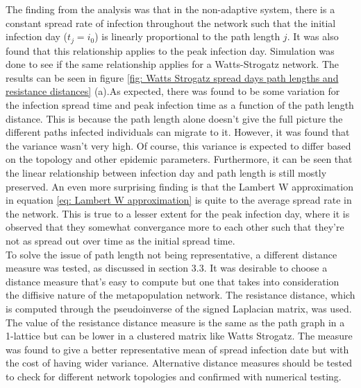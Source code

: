 The finding from the analysis was that in the non-adaptive system, there is a constant spread rate of infection throughout the network such that the initial infection day ($t_j=i_0$) is linearly proportional to the path length $j$. It was also found that this relationship applies to the peak infection day. Simulation was done to see if the same relationship applies for a Watts-Strogatz network. The results can be seen in figure \ref{fig: Watts Strogatz spread days path lengths and resistance distances} (a).As expected, there was found to be some variation for the infection spread time and peak infection time as a function of the path length distance. This is because the path length alone doesn't give the full picture the different paths infected individuals can migrate to it. However, it was found that the variance wasn't very high. Of course, this variance is expected to differ based on the topology and other epidemic parameters. Furthermore, it can be seen that the linear relationship between infection day and path length is still mostly preserved. An even more surprising finding is that the Lambert W approximation in equation \ref{eq: Lambert W approximation} is quite to the average spread rate in the network. This is true to a lesser extent for the peak infection day, where it is observed that they somewhat convergance more to each other such that they're not as spread out over time as the initial spread time.\\

To solve the issue of path length not being representative, a different distance measure was tested, as discussed in section 3.3. It was desirable to choose a distance measure that's easy to compute but one that takes into consideration the diffisive nature of the metapopulation network. The resistance distance, which is computed through the pseudoinverse of the signed Laplacian matrix, was used\cite{xiao2003resistance}. The value of the resistance distance measure is the same as the path graph in a 1-lattice but can be lower in a clustered matrix like Watts Strogatz. The measure was found to give a better representative mean of spread infection date but with the cost of having wider variance. Alternative distance measures should be tested to check for different network topologies and confirmed with numerical testing.

